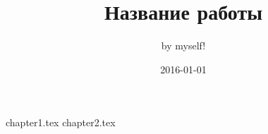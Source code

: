 \documentclass[a4paper,12pt]{article}
\title {Название работы}
\date {2016-01-01}
\author {by myself!}
\begin{document}
	\maketitle
	\clearpage
	\tableofcontents
	\clearpage
	 {chapter1.tex}
	\clearpage
	 {chapter2.tex}
	\clearpage
	\renewcommand{\refname}{Список использованных источников}
	
	
\end{document}
